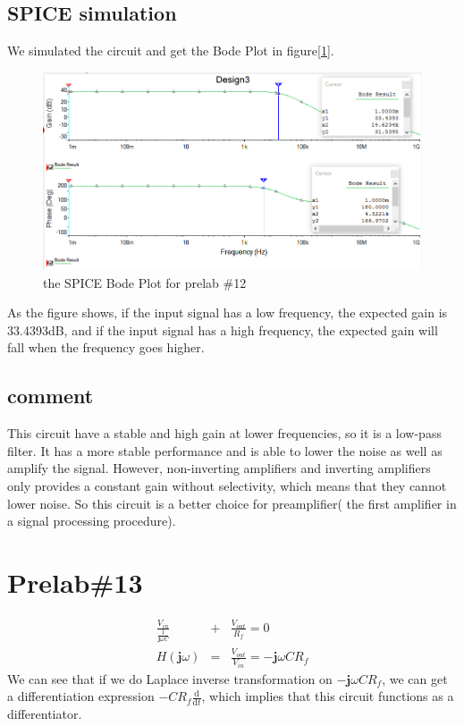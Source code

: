 \documentclass{IEEEtran}
\begin{document}
	\subsection{SPICE simulation}
	We simulated the circuit and get the Bode Plot in figure[\ref{fig:1201}].\\
	\begin{figure}[!htbp]
		\centering
		\begin{framed}
			\includegraphics[width=\linewidth]{images/12_1.PNG}
			\caption{the SPICE Bode Plot for prelab \#12}
			\label{fig:1201}
		\end{framed}
	\end{figure}
	\phantom{ } As the figure shows, if the input signal has a low frequency, the expected gain is 33.4393dB, and if the input signal has a high frequency, the expected gain will fall when the frequency goes higher.
	\subsection{comment}
	\phantom{ } This circuit have a stable and high gain at lower frequencies, so it is a low-pass filter. It has a more stable performance and is able to lower the noise as well as amplify the signal. However, non-inverting amplifiers and inverting amplifiers only provides a constant gain without selectivity, which means that they cannot lower noise. So this circuit is a better choice for preamplifier( the first amplifier in a signal processing procedure).
	\section{\textbf{Prelab\#13}}
	\begin{eqnarray*}
		\frac{V_{in}}{\frac{1}{\mathbf{j}\omega C}} & + & \frac{V_{out}}{R_f}  =  0\\
		H(\mathbf{j}\omega) & = & \frac{V_{out}}{V_{in}}  =  -\mathbf{j}\omega CR_f
	\end{eqnarray*}
	\phantom{ } We can see that if we do Laplace inverse transformation on $ -\mathbf{j}\omega CR_f $, we can get a differentiation expression $ -CR_f\frac{\mathrm{d}}{\mathrm{d}t} $, which implies that this circuit functions as a differentiator.
\end{document}
